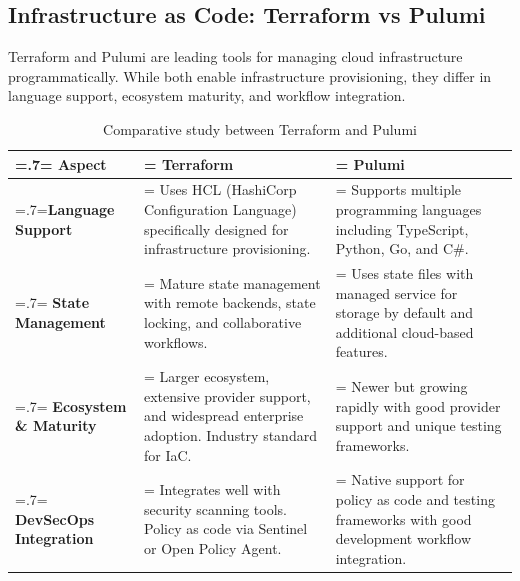 \subsection{Infrastructure as Code: Terraform vs Pulumi}
Terraform and Pulumi are leading tools for managing cloud infrastructure programmatically. While both enable infrastructure provisioning, they differ in language support, ecosystem maturity, and workflow integration.

\begin{table}[H]
    \renewcommand{\arraystretch}{1.5}
    \caption{Comparative study between Terraform and Pulumi}
    \centering
    \medskip
    \begin{tabularx}{1\textwidth} {
            | >{\hsize=.7\hsize\linewidth=\hsize\centering\arraybackslash}X
            | >{\hsize=1.15\hsize\linewidth=\hsize\justifying\arraybackslash}X
            | >{\hsize=1.15\hsize\linewidth=\hsize\justifying\arraybackslash}X |}
        \hline
        \rowcolor{primary} \textbf {Aspect} & \textbf {Terraform}                                                                                                    & \textbf {Pulumi}                                                                                               \\
        \hline
        \textbf {Language Support}          & \noindent Uses HCL (HashiCorp Configuration Language) specifically designed for infrastructure provisioning.           & \noindent Supports multiple programming languages including TypeScript, Python, Go, and C\#.                   \\
        \hline
        \textbf {State Management}          & \noindent Mature state management with remote backends, state locking, and collaborative workflows.                    & \noindent Uses state files with managed service for storage by default and additional cloud-based features.    \\
        \hline
        \textbf {Ecosystem \& Maturity}     & \noindent Larger ecosystem, extensive provider support, and widespread enterprise adoption. Industry standard for IaC. & \noindent Newer but growing rapidly with good provider support and unique testing frameworks.                  \\
        \hline
        \textbf {DevSecOps Integration}     & \noindent Integrates well with security scanning tools. Policy as code via Sentinel or Open Policy Agent.              & \noindent Native support for policy as code and testing frameworks with good development workflow integration. \\
        \hline
    \end{tabularx}
\end{table}

